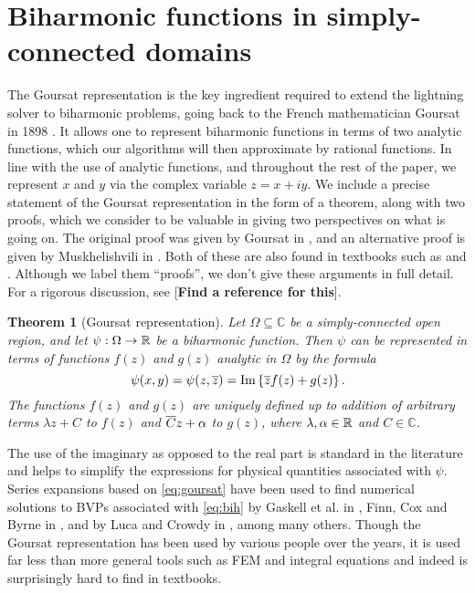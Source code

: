 \newtheorem{theorem}{Theorem}

\section{Biharmonic functions in simply-connected domains \label{sec:goursat}}

The Goursat representation is the key ingredient required to extend the lightning solver to biharmonic problems, going back to the French mathematician Goursat in 1898 \cite{goursat98}. It allows one to represent biharmonic functions in terms of two analytic functions, which our algorithms will then approximate by rational functions. In line with the use of analytic functions, and throughout the rest of the paper, we represent $x$ and $y$ via the complex variable $z = x + iy$. We include a precise statement of the Goursat representation in the form of a theorem, along with two proofs, which we consider to be valuable in giving two perspectives on what is going on. The original proof was given by Goursat in \cite{goursat98}, and an alternative proof is given by Muskhelishvili in \cite{musk19}. Both of these are also found in textbooks such as \cite{ockendon95} and \cite{musk77}. Although we label them ``proofs'', we don’t give these arguments in full detail. For a rigorous discussion, see [\textbf{Find a reference for this}].


\begin{theorem}[Goursat representation]
\label{th:goursat}
Let $\Omega\subseteq\mathbb{C}$ be a simply-connected open region, and let
$\psi : \Omega \rightarrow \mathbb{R}$ be a biharmonic function. Then $\psi$ can be represented in terms of functions $f(z)$ and $g(z)$ analytic in $\Omega$ by the formula
\begin{equation}\label{eq:goursat}
\psi(x,y) = \psi(z,{\overline{z}}) = \Im \left\{ {\overline{z}}f(z) + g(z)\right\}.
\end{equation}
The functions $f(z)$ and $g(z)$ are uniquely defined up to addition of arbitrary terms $\lambda z+C$ to $f(z)$ and ${\overline{C}}z+\alpha$ to $g(z)$, where $\lambda,\alpha\in\mathbb{R}$ and $C\in\mathbb{C}$.
\end{theorem}

The use of the imaginary as opposed to the real part is standard in the literature and helps
to simplify the expressions for physical quantities associated with $\psi$. Series expansions based on
\eqref{eq:goursat} have been used to find numerical solutions to BVPs associated with \eqref{eq:bih} by Gaskell et al. in
\cite{gaskell98}, Finn, Cox and Byrne in \cite{finn03}, and by Luca and Crowdy in \cite{luca18}, among many others. Though
the Goursat representation has been used by various people over the years, it is used far less than more general tools such as FEM and integral equations and indeed is surprisingly hard to find in textbooks.


